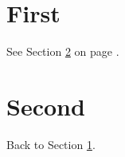 \documentclass{article}
\begin{document}
\section{First}\label{sec:first}
See Section \ref{sec:second} on page \pageref{sec:second}.

\section{Second}\label{sec:second}
Back to Section \ref{sec:first}.
\end{document}
